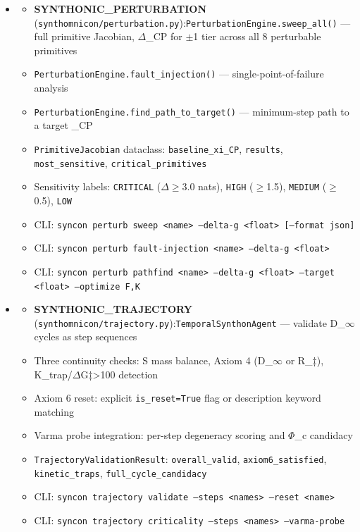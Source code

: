 \documentclass[12pt,a4paper]{article}
\begin{document}
\begin{itemize}
    \begin{itemize}
    \item 
    \begin{itemize}
    \item \textbf{SYNTHONIC\_PERTURBATION} (\texttt{synthomnicon/perturbation.py}):\texttt{PerturbationEngine.sweep\_all()} --- full primitive Jacobian, $\Delta$\xi\_CP for $\pm$1 tier across all 8 perturbable primitives
    \item \texttt{PerturbationEngine.fault\_injection()} --- single-point-of-failure analysis
    \item \texttt{PerturbationEngine.find\_path\_to\_target()} --- minimum-step path to a target \xi\_CP
    \item \texttt{PrimitiveJacobian} dataclass: \texttt{baseline\_xi\_CP}, \texttt{results}, \texttt{most\_sensitive}, \texttt{critical\_primitives}
    \item Sensitivity labels: \texttt{CRITICAL} ($\Delta$$\geq$3.0 nats), \texttt{HIGH} ($\geq$1.5), \texttt{MEDIUM} ($\geq$0.5), \texttt{LOW}
    \item CLI: \texttt{syncon perturb sweep \textless{}name\textgreater{} --delta-g \textless{}float\textgreater{} {[}--format json{]}}
    \item CLI: \texttt{syncon perturb fault-injection \textless{}name\textgreater{} --delta-g \textless{}float\textgreater{}}
    \item CLI: \texttt{syncon perturb pathfind \textless{}name\textgreater{} --delta-g \textless{}float\textgreater{} --target \textless{}float\textgreater{} --optimize F,K}
\end{itemize}

    \item 
    \begin{itemize}
    \item \textbf{SYNTHONIC\_TRAJECTORY} (\texttt{synthomnicon/trajectory.py}):\texttt{TemporalSynthonAgent} --- validate D\_$\infty$ cycles as step sequences
    \item Three continuity checks: S mass balance, Axiom 4 (D\_$\infty$ or R\_‡), K\_trap/$\Delta$G‡\textgreater{}100 detection
    \item Axiom 6 reset: explicit \texttt{is\_reset=True} flag or description keyword matching
    \item Varma probe integration: per-step degeneracy scoring and $\Phi$\_c candidacy
    \item \texttt{TrajectoryValidationResult}: \texttt{overall\_valid}, \texttt{axiom6\_satisfied}, \texttt{kinetic\_traps}, \texttt{full\_cycle\_candidacy}
    \item CLI: \texttt{syncon trajectory validate --steps \textless{}names\textgreater{} --reset \textless{}name\textgreater{}}
    \item CLI: \texttt{syncon trajectory criticality --steps \textless{}names\textgreater{} --varma-probe}
\end{itemize}


\end{itemize}
\end{itemize}
\end{document}
